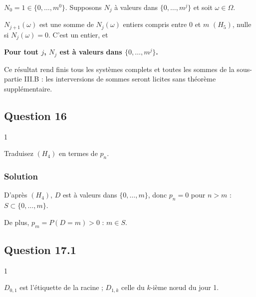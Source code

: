 \documentclass[11pt,a4paper]{article}
\newcommand{\equationajustee}[1]{%
  \sbox{\boiteequation}{$\displaystyle #1$}%
  \ifdim\wd\boiteequation>\linewidth
    \[\resizebox{\linewidth}{!}{\usebox{\boiteequation}}\]%
  \else
    \[#1\]%
  \fi}
\begin{document}
\(N_0=1\in\{0,\dots,m^0\}\). Supposons \(N_j\) à valeurs dans \(\{0,\dots,m^j\}\) et soit \(\omega\in\Omega\).

\(N_{j+1}(\omega)\) est une somme de \(N_j(\omega)\) entiers compris entre \(0\) et \(m\) \((H_5)\), nulle si \(N_j(\omega)=0\). C'est un entier, et

\equationajustee{\begin{aligned}
0\le N_{j+1}(\omega)&\le mN_j(\omega)\\
&\le m^{j+1}.
\end{aligned}}

\textbf{Pour tout \(j\), \(N_j\) est à valeurs dans \(\{0,\dots,m^j\}\).}

\begin{methode}

Ce résultat rend finis tous les systèmes complets et toutes les sommes de la sous-partie III.B : les interversions de sommes seront licites sans théorème supplémentaire.

\end{methode}

\hypertarget{question-16}{%
\subsection{Question 16}\label{question-16}}

\begin{indication}{1}

Traduisez \((H_4)\) en termes de \(p_n\).

\end{indication}

\hypertarget{solution-29}{%
\subsubsection{Solution}\label{solution-29}}

D'après \((H_4)\), \(D\) est à valeurs dans \(\{0,\dots,m\}\), donc \(p_n=0\) pour \(n>m\) : \textbf{\(S\subset\{0,\dots,m\}\)}.

De plus, \(p_m=P(D=m)>0\) : \textbf{\(m\in S\)}.

\hypertarget{question-17.1}{%
\subsection{Question 17.1}\label{question-17.1}}

\begin{indication}{1}

\(D_{0,1}\) est l'étiquette de la racine ; \(D_{1,k}\) celle du \(k\)-ième nœud du jour 1.

\end{indication}
\end{document}
